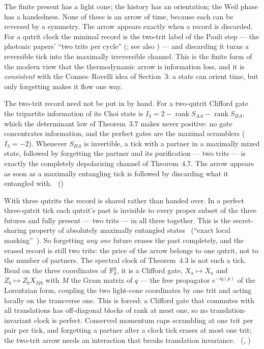 \begin{physical}
The finite present has a light cone; the history has an orientation; the Weil phase has a
handedness. None of these is an arrow of time, because each can be reversed by a symmetry.
The arrow appears exactly when a record is discarded. For a qutrit clock the minimal
record is the two-trit label of the Pauli step --- the photonic papers' ``two trits per
cycle'' (; see also ) --- and discarding it turns a reversible tick into the maximally
irreversible channel. This is the finite form of the modern view that the thermodynamic
arrow is information loss, and it is \emph{consistent} with the Connes--Rovelli idea of
Section~3: a state can orient time, but only forgetting makes it flow one way. \tierB
\end{physical}

The two-trit record need not be put in by hand. For a two-qutrit Clifford gate the tripartite information of its Choi
state is $I_3=2-\operatorname{rank}S_{AA}-\operatorname{rank}S_{BA}$, which the determinant law of Theorem~3.7 makes
never positive: no gate concentrates information, and the perfect gates are the maximal scramblers ($I_3=-2$). Whenever
$S_{BA}$ is invertible, a tick with a partner in a maximally mixed state, followed by forgetting the partner and its
purification --- two trits --- is exactly the completely depolarising channel of Theorem~4.7. The arrow appears as soon
as a maximally entangling tick is followed by discarding what it entangled with.
\tierC\ ()

With three qutrits the record is shared rather than handed over. In a perfect three-qutrit tick each qutrit's past is
invisible to every proper subset of the three futures and fully present --- two trits --- in all three together. This is
the secret-sharing property of absolutely maximally entangled states~\cite{Helwig2012} (``exact local
masking''~\cite{Pahari2026}). So forgetting \emph{any one} future erases the past completely, and the erased record is
still two trits: the price of the arrow belongs to one qutrit, not to the number of partners. The spectral clock of
Theorem~4.3 is not such a tick. Read on the three coordinates of $\mathbb{F}_3^3$, it is a Clifford gate, $X_a\mapsto X_a$ and
$Z_b\mapsto Z_bX_{Mb}$ with $M$ the Gram matrix of $q$ --- the free propagator $e^{-iq(p)}$ of the Lorentzian form,
coupling the two light-cone coordinates by one trit and acting locally on the transverse one. This is forced: a Clifford
gate that commutes with all translations has off-diagonal blocks of rank at most one, so no translation-invariant clock
is perfect. Conserved momentum caps scrambling at one trit per pair per tick, and forgetting a partner after a clock tick
erases at most one trit; the two-trit arrow needs an interaction that breaks translation invariance.
\tierC\ (, )

